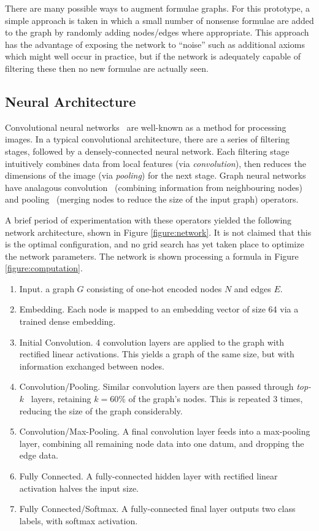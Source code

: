 \documentclass[runningheads]{llncs}
\begin{document}
There are many possible ways to augment formulae graphs.
For this prototype, a simple approach is taken in which a small number of nonsense formulae are added to the graph by randomly adding nodes/edges where appropriate.
This approach has the advantage of exposing the network to ``noise'' such as additional axioms which might well occur in practice, but if the network is adequately capable of filtering these then no new formulae are actually seen.

\subsection{Neural Architecture}
Convolutional neural networks~\cite{cnn} are well-known as a method for processing images.
In a typical convolutional architecture, there are a series of filtering stages, followed by a densely-connected neural network.
Each filtering stage intuitively combines data from local features (via \emph{convolution}), then reduces the dimensions of the image (via \emph{pooling}) for the next stage.
Graph neural networks have analagous convolution~\cite{gcn} (combining information from neighbouring nodes) and pooling~\cite{top-k-pooling} (merging nodes to reduce the size of the input graph) operators.

A brief period of experimentation with these operators yielded the following network architecture, shown in Figure \ref{figure:network}.
It is not claimed that this is the optimal configuration, and no grid search has yet taken place to optimize the network parameters.
The network is shown processing a formula in Figure \ref{figure:computation}.
\begin{enumerate}
	\item Input. a graph \(G\) consisting of one-hot encoded nodes \(N\) and edges \(E\).
	\item Embedding. Each node is mapped to an embedding vector of size 64 via a trained dense embedding.
	\item Initial Convolution. 4 convolution layers are applied to the graph with rectified linear activations. This yields a graph of the same size, but with information exchanged between nodes.
	\item Convolution/Pooling. Similar convolution layers are then passed through \emph{top-\(k\)}~\cite{top-k-pooling} layers, retaining \(k = 60\%\) of the graph's nodes. This is repeated 3 times, reducing the size of the graph considerably.
	\item Convolution/Max-Pooling. A final convolution layer feeds into a max-pooling layer, combining all remaining node data into one datum, and dropping the edge data.
	\item Fully Connected. A fully-connected hidden layer with rectified linear activation halves the input size.
	\item Fully Connected/Softmax. A fully-connected final layer outputs two class labels, with softmax activation.
\end{enumerate}
\end{document}
